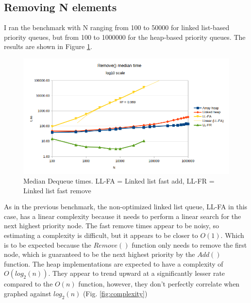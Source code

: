 \documentclass[a4paper,11pt]{article}
\begin{document}
    \subsection*{Removing N elements}

    I ran the benchmark with N ranging from 100 to 50000 for linked list-based priority queues, but from 100 to 1000000 for the heap-based priority queues. The results are shown in Figure \ref{fig:remove}.

    \begin{figure}[H]
        \centering
        \includegraphics[width=\textwidth]{remove.png}
        \caption{Median Dequeue times. LL-FA = Linked list fast add, LL-FR = Linked list fast remove}
        \label{fig:remove}
    \end{figure}

    As in the previous benchmark, the non-optimized linked list queue, LL-FA in this case, has a linear complexity because it needs to perform a linear search for the next highest priority node. The fast remove times appear to be noisy, so estimating a complexity is difficult, but it appears to be closer to $O(1)$. Which is to be expected because the $Remove()$ function only needs to remove the first node, which is guaranteed to be the next highest priority by the $Add()$ function. The heap implementations are expected to have a complexity of $O(log_2{(n)})$. They appear to trend upward at a significantly lesser rate compared to the $O(n)$ function, however, they don't perfectly correlate when graphed against $log_2{(n)}$ (Fig. \ref{fig:complexity})
\end{document}
